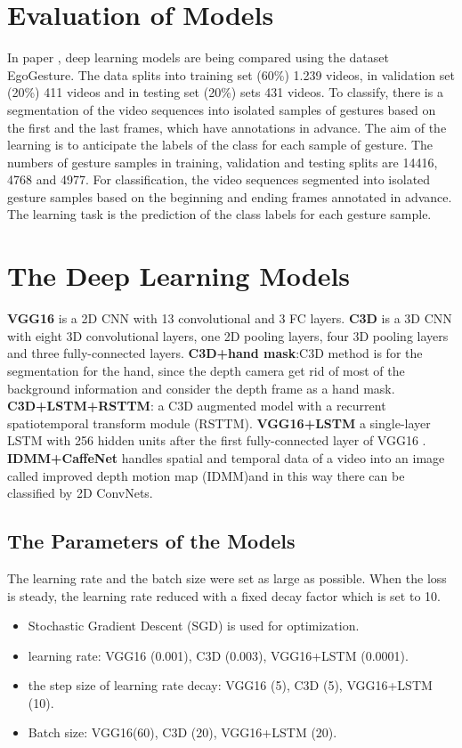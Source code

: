 \documentclass[12pt]{book}
\begin{document}
\section{Evaluation of Models}
In paper \cite{EGO2018}, deep learning models are being compared using the dataset EgoGesture. The data splits into training set (60\%) 1.239 videos, in validation set (20\%) 411 videos and in testing set (20\%) sets 431 videos. To classify, there is a segmentation of the video sequences into isolated samples of gestures based on the first and the last frames, which have annotations in advance. The aim of the learning is to anticipate the labels of the class for each sample of gesture. The numbers of gesture samples in training, validation and testing splits are 14416, 4768 and 4977. For classification, the video sequences segmented into isolated gesture samples based on the beginning and ending frames annotated in advance. The learning task is the prediction of the class labels for each gesture sample. 

\section{The Deep Learning Models}
\textbf{VGG16} is a 2D CNN with 13 convolutional and 3 FC layers.
 \textbf{C3D} is a 3D CNN with eight 3D convolutional layers, one 2D pooling layers, four 3D pooling layers and three fully-connected layers. \textbf{C3D+hand mask}:C3D method is for the segmentation for the hand, since the depth camera get rid of most of the background information and consider the depth frame as a hand mask. \textbf{C3D+LSTM+RSTTM}: a C3D augmented model with a recurrent spatiotemporal transform module (RSTTM). \textbf{VGG16+LSTM} a single-layer LSTM with 256 hidden units after the first fully-connected layer of VGG16 .
 \textbf{IDMM+CaffeNet} handles spatial and temporal data of a video into an image called improved depth motion map (IDMM)and in this way there can be classified by 2D ConvNets.

\subsection{The Parameters of the Models}
The learning rate and the batch size were set as large as possible. When the loss is steady, the learning rate reduced with a fixed decay factor which is set to 10.

\begin{itemize}
    \item Stochastic Gradient Descent (SGD) is used for optimization. 

\item learning rate: VGG16 (0.001), C3D (0.003), VGG16+LSTM (0.0001). 

\item the step size of learning rate decay: VGG16 (5), C3D (5), VGG16+LSTM (10). 

\item Batch size: VGG16(60), C3D (20), VGG16+LSTM (20).  
\end{itemize}
\end{document}

